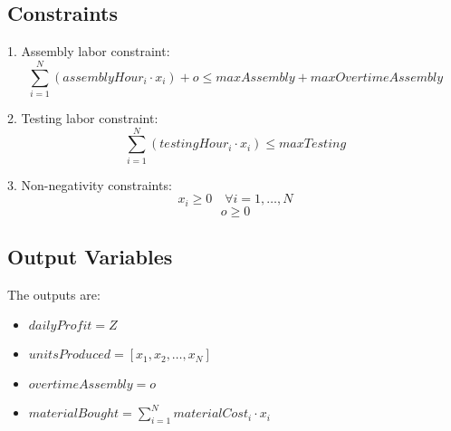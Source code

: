 \documentclass{article}
\begin{document}
\subsection*{Constraints}
1. Assembly labor constraint:
\[
\sum_{i=1}^{N} (assemblyHour_i \cdot x_i) + o \leq maxAssembly + maxOvertimeAssembly
\]

2. Testing labor constraint:
\[
\sum_{i=1}^{N} (testingHour_i \cdot x_i) \leq maxTesting
\]

3. Non-negativity constraints:
\[
x_i \geq 0 \quad \forall i = 1, \ldots, N
\]
\[
o \geq 0
\]

\subsection*{Output Variables}
The outputs are:
\begin{itemize}
    \item $dailyProfit = Z$
    \item $unitsProduced = [x_1, x_2, \ldots, x_N]$
    \item $overtimeAssembly = o$
    \item $materialBought = \sum_{i=1}^{N} materialCost_i \cdot x_i$
\end{itemize}
\end{document}
